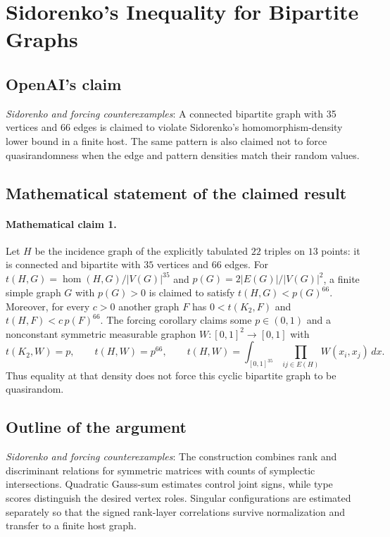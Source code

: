 \documentclass[11pt]{article}
\begin{document}
\section*{Sidorenko's Inequality for Bipartite Graphs}

\subsection{OpenAI's claim}
\textit{Sidorenko and forcing counterexamples}: A connected bipartite graph with 35 vertices and 66 edges is claimed to violate Sidorenko’s homomorphism-density lower bound in a finite host. The same pattern is also claimed not to force quasirandomness when the edge and pattern densities match their random values.

\subsection{Mathematical statement of the claimed result}
\paragraph{Mathematical claim 1.} Let $H$ be the incidence graph of the explicitly tabulated $22$ triples on $13$ points: it is connected and bipartite with $35$ vertices and $66$ edges. For $t(H,G)=\operatorname{hom}(H,G)/|V(G)|^{35}$ and $p(G)=2|E(G)|/|V(G)|^2$, a finite simple graph $G$ with $p(G)>0$ is claimed to satisfy $t(H,G)<p(G)^{66}$. Moreover, for every $c>0$ another graph $F$ has $0<t(K_2,F)$ and $t(H,F)<c\,p(F)^{66}$. The forcing corollary claims some $p\in(0,1)$ and a nonconstant symmetric measurable graphon $W:[0,1]^2\to[0,1]$ with \[t(K_2,W)=p,\qquad t(H,W)=p^{66},\qquad t(H,W)=\int_{[0,1]^{35}}\prod_{ij\in E(H)}W(x_i,x_j)\,dx.\] Thus equality at that density does not force this cyclic bipartite graph to be quasirandom.

\subsection{Outline of the argument}
\textit{Sidorenko and forcing counterexamples}: The construction combines rank and discriminant relations for symmetric matrices with counts of symplectic intersections. Quadratic Gauss-sum estimates control joint signs, while type scores distinguish the desired vertex roles. Singular configurations are estimated separately so that the signed rank-layer correlations survive normalization and transfer to a finite host graph.
\end{document}
